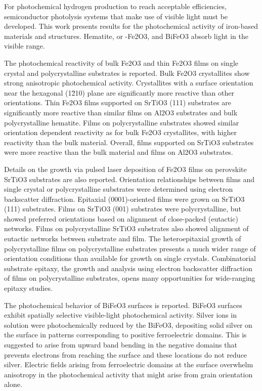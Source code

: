 \documentclass[12pt,%
              twoside,
               letterpaper]{uiothesis}
\begin{document}
For photochemical hydrogen production to reach acceptable efficiencies, semiconductor
photolysis systems that make use of visible light must be developed. This work presents
results for the photochemical activity of iron-based materials and structures. Hematite,
or \textalpha-Fe2O3, and BiFeO3 absorb light in the visible range. 

The photochemical reactivity of bulk Fe2O3 and thin Fe2O3 films on single
crystal and polycrystalline substrates is reported. Bulk Fe2O3 crystallites show
strong anisotropic photochemical activity. Crystallites with a surface orientation near
the hexagonal (1\={2}10) plane are significantly more reactive than other orientations.
Thin Fe2O3 films supported on SrTiO3 (111) substrates are significantly more
reactive than similar films on Al2O3 substrates and bulk polycrystalline hematite.
Films on polycrystalline substrates showed similar orientation dependent reactivity as for
bulk Fe2O3 crystallites, with higher reactivity than the bulk material.
Overall, films supported on SrTiO3 substrates were more reactive than the bulk
material and films on Al2O3 substrates.

Details on the growth via pulsed laser deposition of Fe2O3 films on perovskite
SrTiO3 substrates are also reported. Orientation relationships between films and
single crystal or polycrystalline substrates were determined using electron backscatter
diffraction. Epitaxial (0001)-oriented films were grown on SrTiO3 (111) substrates.
Films on SrTiO3 (001) substrates were polycrystalline, but showed preferred
orientations based on alignment of close-packed (eutactic) networks. Films on
polycrystalline SrTiO3 substrates also showed alignment of eutactic networks between
substrate and film. The heteroepitaxial growth of polycrystalline films on polycrystalline
substrates presents a much wider range of orientation conditions than available for growth
on single crystals. Combinatorial substrate epitaxy, the growth and analysis using
electron backscatter diffraction of films on polycrystalline substrates, opens many
opportunities for wide-ranging epitaxy studies. 

The photochemical behavior of BiFeO3 surfaces is reported. BiFeO3 surfaces exhibit
spatially selective visible-light photochemical activity. Silver ions in solution were
photochemically reduced by the BiFeO3, depositing solid silver on the surface in patterns
corresponding to positive ferroelectric domains. This is suggested to arise from upward
band bending in the negative domains that prevents electrons from reaching the surface and
these locations do not reduce silver. Electric fields arising from ferroelectric domains
at the surface overwhelm anisotropy in the photochemical activity that might arise from
grain orientation alone.
    
\end{document}
